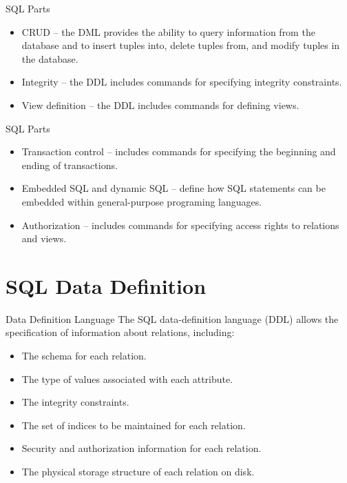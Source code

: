 \documentclass{beamer}
\begin{document}
\begin{frame}{SQL Parts}
    \begin{itemize}
        \item CRUD -- the DML provides the ability to query information from the database and to insert tuples into, delete tuples from, and modify tuples in the database.
        \item Integrity -- the DDL includes commands for specifying integrity constraints.
        \item View definition -- the DDL includes commands for defining views.
    \end{itemize}
\end{frame}

\begin{frame}{SQL Parts}
    \begin{itemize}
        \item Transaction control -- includes commands for specifying the beginning and ending of transactions.
        \item Embedded SQL and dynamic SQL -- define how SQL statements can be embedded within general-purpose programing languages.
        \item Authorization -- includes commands for specifying access rights to relations and views.
    \end{itemize}
\end{frame}

\section{SQL Data Definition}

\begin{frame}{Data Definition Language}
    The SQL data-definition language (DDL) allows the specification of information about relations, including:
    \begin{itemize}
        \item The schema for each relation.
        \item The type of values associated with each attribute.
        \item The integrity constraints.
        \item The set of indices to be maintained for each relation.
        \item Security and authorization information for each relation.
        \item The physical storage structure of each relation on disk.
    \end{itemize}
\end{frame}
\end{document}
